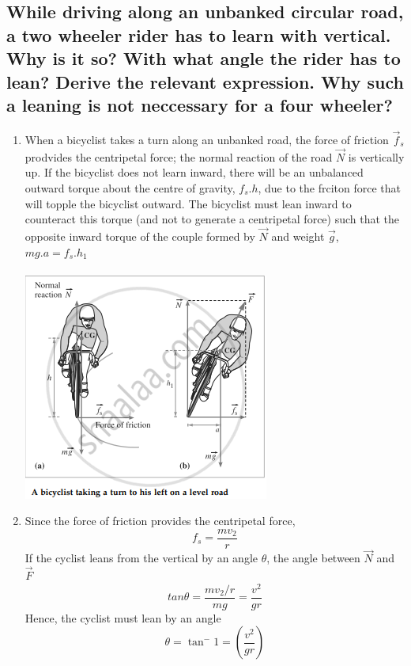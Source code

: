 \documentclass{article}
\begin{document}
   \subsection{While driving along an unbanked circular road, a
   two wheeler rider has to learn with vertical. Why is it so?
   With what angle the rider has to lean? Derive the relevant
   expression. Why such a leaning is not neccessary for a four
   wheeler?}
   \begin{enumerate}
	\item When a bicyclist takes a turn along an unbanked
	road, the force of friction $\vec{f}_s$ prodvides the
	centripetal force; the normal reaction of the road
	$\vec{N}$ is vertically up. If the bicyclist does not
	learn inward, there will be an unbalanced outward
	torque about the centre of gravity, $f_s.h$, due to
	the frciton force that will topple the bicyclist 
	outward. The bicyclist must lean inward to counteract
	this torque (and not to generate a centripetal force)
	such that the opposite inward torque of the couple 
	formed by $\vec{N}$ and weight $\vec{g}$, $mg.a = 
	f_s.h_1$ \\ \\
	\includegraphics[scale=0.5]{bicyclist}

	\item Since the force of friction provides the
	centripetal force, 
	\begin{equation}
		f_s = \frac{mv_2}{r}
	\end{equation}
	If the cyclist leans from the vertical by an angle 
	$\theta$, the angle between $\vec{N}$ and $\vec{F}$
	\begin{equation}
		tan \theta = \frac{mv_2 / r}{mg} = 
		\frac{v^2}{gr}
	\end{equation}
	Hence, the cyclist must lean by an angle
	\begin{equation}
	    	\theta = \tan^-1 = (\frac{v^2}{gr})
	\end{equation}


\end{enumerate}
\end{document}
